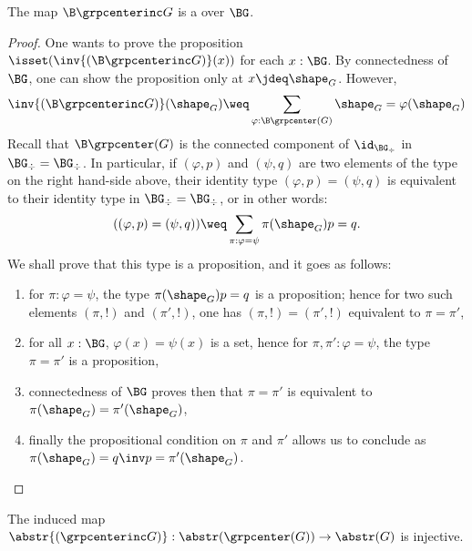\begin{lemma}
  \label{lemma:center-is-subgroup}%
  The map $\B \grpcenterinc G$ is a \covering over $\BG$.
\end{lemma}
\begin{proof}
  One wants to prove the proposition
  $\isset(\inv{(\B\grpcenterinc G)}(x))$ for each $x:\BG$. By connectedness
  of $\BG$, one can show the proposition only at $x\jdeq
  \shape_G$. However,
  \begin{displaymath}
    \inv{(\B\grpcenterinc G)}(\shape_G) \weq \sum_{\varphi:{\B\grpcenter(G)}}{\shape_G = \varphi(\shape_G)}
  \end{displaymath}
  Recall that $\B\grpcenter(G)$ is the connected component of
  $\id_{\BG_\div}$ in $\BG_\div = \BG_\div$. In particular, if $(\varphi,p)$
  and $(\psi,q)$ are two elements of the type on the right hand-side
  above, their identity type $(\varphi,p)=(\psi,q)$ is equivalent to
  their identity type in $\BG_\div = \BG_\div$, or in other words:
  \begin{displaymath}
    ((\varphi,p) = (\psi,q)) \weq \sum_{\pi:\varphi=\psi}\pi(\shape_G) p = q.
  \end{displaymath}
  We shall prove that this type is a proposition, and it goes as
  follows:
  \begin{enumerate}
  \item for $\pi:\varphi=\psi$, the type $\pi(\shape_G) p = q$ is a
    proposition; hence for two such elements $(\pi,!)$ and $(\pi',!)$,
    one has $(\pi,!)=(\pi',!)$ equivalent to $\pi=\pi'$,
  \item for all $x:\BG$, $\varphi(x)=\psi(x)$ is a set, hence for
    $\pi,\pi':\varphi=\psi$, the type $\pi=\pi'$ is a proposition,
  \item connectedness of $\BG$ proves then that $\pi=\pi'$ is equivalent
    to $\pi(\shape_G)=\pi'(\shape_G)$,
  \item finally the propositional condition on $\pi$ and $\pi'$ allows
    us to conclude as $\pi(\shape_G)= q\inv p = \pi'(\shape_G)$.
  \end{enumerate}
\end{proof}

\begin{corollary}
  \label{lemma:center-inc-inj-on-paths}%
  The induced map
  $\abstr {(\grpcenterinc G)}: \abstr(\grpcenter(G)) \to \abstr(G)$ is
  injective.
\end{corollary}

